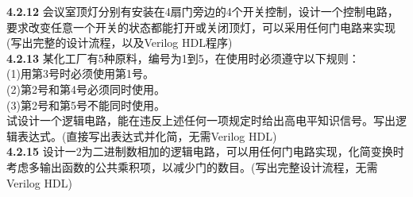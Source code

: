 \documentclass[a4paper,11pt,UTF8]{article}
\begin{document}
\textbf{4.2.12} 会议室顶灯分别有安装在4扇门旁边的4个开关控制，设计一个控制电路，要求改变任意一个开关的状态都能打开或关闭顶灯，可以采用任何门电路来实现(写出完整的设计流程，以及Verilog HDL程序)\\
\textbf{4.2.13} 某化工厂有5种原料，编号为1到5，在使用时必须遵守以下规则：\\
(1)用第3号时必须使用第1号。\\
(2)第2号和第4号必须同时使用。\\
(3)第2号和第5号不能同时使用。\\
试设计一个逻辑电路，能在违反上述任何一项规定时给出高电平知识信号。写出逻辑表达式。(直接写出表达式并化简，无需Verilog HDL)\\
\textbf{4.2.15} 设计一2为二进制数相加的逻辑电路，可以用任何门电路实现，化简变换时考虑多输出函数的公共乘积项，以减少门的数目。(写出完整设计流程，无需Verilog HDL)\\
\end{document}
